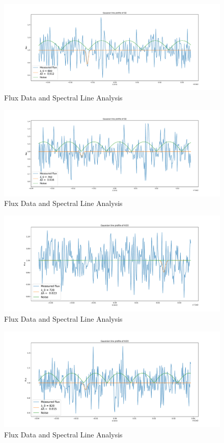 \documentclass[reprint,english,notitlepage]{revtex4-2}
\begin{document}
\begin{figure}[h!]  
    \centering
    \includegraphics[scale =.3]{Figures/O2 690.pdf}
    \caption{Flux Data and Spectral Line Analysis}
    \label{fig: O2 690}
\end{figure}

\begin{figure}[h!]
  \centering
  \includegraphics[scale =.3]{Figures/O2 760.pdf}
  \caption{Flux Data and Spectral Line Analysis}
  \label{fig: O2 760}
\end{figure}

\begin{figure}[h!]
  \centering
  \includegraphics[scale =.3]{Figures/H2O 720.pdf}
  \caption{Flux Data and Spectral Line Analysis}
  \label{fig: H2 720}
\end{figure}

\begin{figure}[h!]
  \centering
  \includegraphics[scale =.3]{Figures/H2O 820.pdf}
  \caption{Flux Data and Spectral Line Analysis}
  \label{fig: H2 820}
\end{figure}
\end{document}
